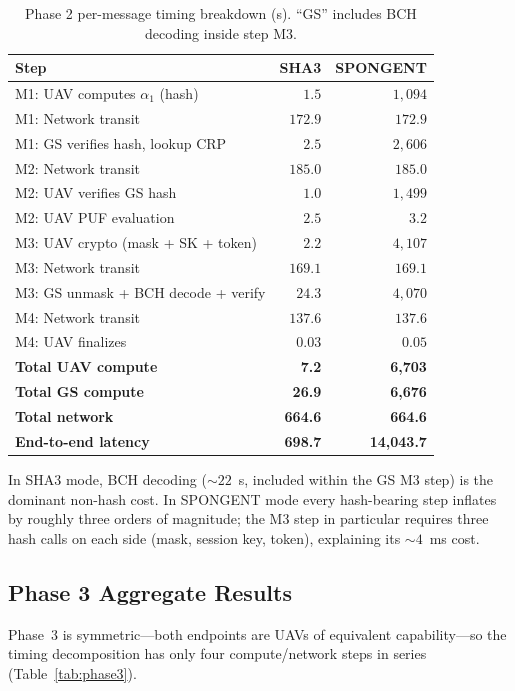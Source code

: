 \documentclass[conference,a4paper,10pt]{IEEEtran}
\begin{document}
\begin{table}[t]
\centering
\caption{Phase 2 per-message timing breakdown (\textmu s).
``GS'' includes BCH decoding inside step M3.}
\label{tab:phase2_break}
\begin{tabular}{@{}p{4.5cm}rr@{}}
\toprule
\textbf{Step} & \textbf{SHA3} & \textbf{SPONGENT} \\
\midrule
M1: UAV computes $\alpha_1$ (hash)        & $1.5$   & $1{,}094$ \\
M1: Network transit                       & $172.9$ & $172.9$ \\
M1: GS verifies hash, lookup CRP          & $2.5$   & $2{,}606$ \\
M2: Network transit                       & $185.0$ & $185.0$ \\
M2: UAV verifies GS hash                  & $1.0$   & $1{,}499$ \\
M2: UAV PUF evaluation                    & $2.5$   & $3.2$ \\
M3: UAV crypto (mask + SK + token)        & $2.2$   & $4{,}107$ \\
M3: Network transit                       & $169.1$ & $169.1$ \\
M3: GS unmask + BCH decode + verify       & $24.3$  & $4{,}070$ \\
M4: Network transit                       & $137.6$ & $137.6$ \\
M4: UAV finalizes                         & $0.03$  & $0.05$ \\
\midrule
\textbf{Total UAV compute}                & \textbf{7.2} & \textbf{6{,}703} \\
\textbf{Total GS compute}                 & \textbf{26.9} & \textbf{6{,}676} \\
\textbf{Total network}                    & \textbf{664.6} & \textbf{664.6} \\
\textbf{End-to-end latency}               & \textbf{698.7} & \textbf{14{,}043.7} \\
\bottomrule
\end{tabular}
\end{table}

In SHA3 mode, BCH decoding ($\sim 22$~\textmu s, included within the
GS M3 step) is the dominant non-hash cost. In SPONGENT mode every
hash-bearing step inflates by roughly three orders of magnitude; the
M3 step in particular requires three hash calls on each side
(mask, session key, token), explaining its $\sim 4$~ms cost.

\subsection{Phase 3 Aggregate Results}
Phase~3 is symmetric---both endpoints are UAVs of equivalent
capability---so the timing decomposition has only four
compute/network steps in series (Table~\ref{tab:phase3}).
\end{document}
